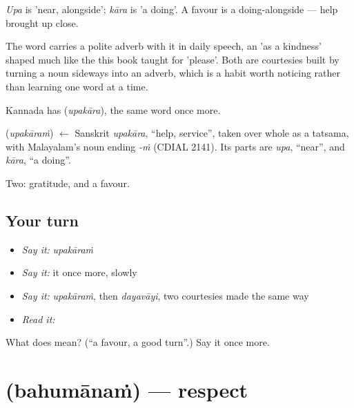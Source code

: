 \emph{Upa} is 'near, alongside'; \emph{kāra} is 'a doing'. A favour is a doing-alongside — help brought up close.

The word carries a polite adverb with it in daily speech, an 'as a kindness' shaped much like the  this book taught for 'please'. Both are courtesies built by turning a noun sideways into an adverb, which is a habit worth noticing rather than learning one word at a time.

Kannada has  (\emph{upakāra}), the same word once more.

\begin{cousinweb}
\textbf{} (\emph{upakāraṁ}) $\leftarrow$ Sanskrit \emph{upakāra}, \textquotedblleft{}help, service\textquotedblright{}, taken over whole as a tatsama, with Malayalam's noun ending \emph{-ṁ} (CDIAL 2141). Its parts are \emph{upa}, \textquotedblleft{}near\textquotedblright{}, and \emph{kāra}, \textquotedblleft{}a doing\textquotedblright{}.
\end{cousinweb}

\begin{grammarlens}[title={What you've built}]
Two: gratitude, and a favour.
\end{grammarlens}

\subsection*{Your turn}
\begin{itemize}
\raggedright
  \item \emph{Say it:} \emph{upakāraṁ}
  \item \emph{Say it:} it once more, slowly
  \item \emph{Say it:} \emph{upakāraṁ}, then \emph{dayavāyi}, two courtesies made the same way
  \item \emph{Read it:} \textbf{}
\end{itemize}

\begin{tcolorbox}[breakable,colback=teal!4,colframe=teal!35!black,title={Before you move on}]
What does  mean? (\textquotedblleft{}a favour, a good turn\textquotedblright{}.) Say it once more.
\end{tcolorbox}
\section[\texorpdfstring{\ml{ബഹുമാനം} (bahumānaṁ)}{ബഹുമാനം (bahumānaṁ)}]{ (bahumānaṁ) — respect}

